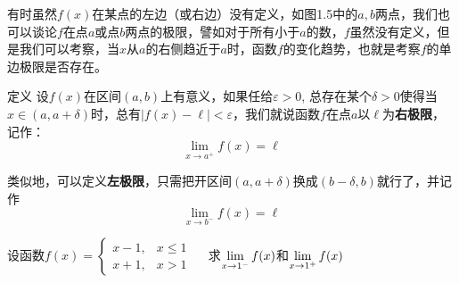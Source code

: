 有时虽然$f(x)$在某点的左边（或右边）没有定义，如图1.5中的$a,b$两点，我们也可以谈论$f$在点$a$或点$b$两点的极限，譬如对于所有小于$a$的数，$f$虽然没有定义，但是我们可以考察，当$x$从$a$的右侧趋近于$a$时，函数$f$的变化趋势，也就是考察$f$的单边极限是否存在。

\begin{figure}[htp]
    \centering
{}
    \caption{}
\end{figure}

\begin{blk}{定义}
     设$f(x)$在区间$(a,b)$上有意义，如果任给$\varepsilon>0$, 总存在某个$\delta>0$使得当$x\in (a,a+\delta)$时，总有$|f(x)-\ell|<\varepsilon$，我们就说函数$f$在点$a$以$\ell$为\textbf{右极限}，记作：
\[\lim_{x\to a^+}f(x)=\ell\]
\end{blk}

类似地，可以定义\textbf{左极限}，只需把开区间$(a,a+\delta)$换成$(b-\delta,b)$就行了，并记作
\[\lim_{x\to b^-} f(x)=\ell\]

\begin{example}
    设函数$f(x)=\begin{cases}
        x-1,&x\le 1\\
x+1,&x>1
    \end{cases}\quad $    
    求$\displaystyle\lim_{x\to 1^-}f(x)$和$\displaystyle\lim_{x\to 1^+}f(x)$
\end{example}

